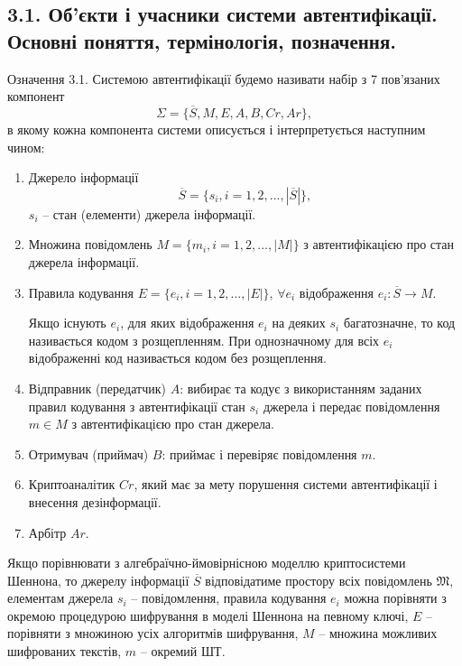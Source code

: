 \subsection{3.1. Об’єкти і учасники системи автентифікації. Основні поняття,
термінологія, позначення.}

\begin{definition}
    Означення 3.1. Системою автентифікації будемо називати набір з 7
    пов’язаних компонент
    \begin{equation*}
        \Sigma = \{\overline{S}, M, E, A, B, Cr, Ar\},
    \end{equation*}
    в якому кожна компонента системи описується і інтерпретується
    наступним чином:
    \begin{enumerate}
        \item Джерело інформації
        \begin{equation*}
            \overline{S} = \{s_i, i = 1, 2, ..., |\overline{S}|\},
        \end{equation*}
        $s_i$ -- стан (елементи) джерела інформації.
        \item Множина повідомлень $M = \{m_i, i = 1, 2, ..., |M|\}$ з автентифікацією про стан
        джерела інформації.
        \item Правила кодування $E = \{e_i, i = 1, 2, ..., |E|\}$, $\forall e_i$ відображення $e_i: \overline{S} \rightarrow M$.
        
        Якщо існують $e_i$, для яких відображення $e_i$ на деяких $s_i$
        багатозначне, то код називається кодом з розщепленням. При
        однозначному для всіх $e_i$ відображенні код називається кодом без
        розщеплення.
        \item Відправник (передатчик) $A$: вибирає та кодує з використанням заданих
        правил кодування з автентифікації стан $s_i$ джерела і передає повідомлення
        $m \in M$ з автентифікацією про стан джерела.
        \item Отримувач (приймач) $B$: приймає і перевіряє повідомлення $m$.
        \item Криптоаналітик $Cr$, який має за мету порушення системи автентифікації і
        внесення дезінформації.
        \item Арбітр $Ar$.
    \end{enumerate}
\end{definition}
    
Якщо порівнювати з алгебраїчно-ймовірнісною моделлю криптосистеми
Шеннона, то джерелу інформації $\overline{S}$ відповідатиме простору всіх повідомлень
$\mathfrak{M}$, елементам джерела $s_i$ -- повідомлення, правила кодування $e_i$ можна
порівняти з окремою процедурою шифрування в моделі Шеннона на певному
ключі, $E$ -- порівняти з множиною усіх алгоритмів шифрування, $M$ -- множина
можливих шифрованих текстів, $m$ -- окремий ШТ.

